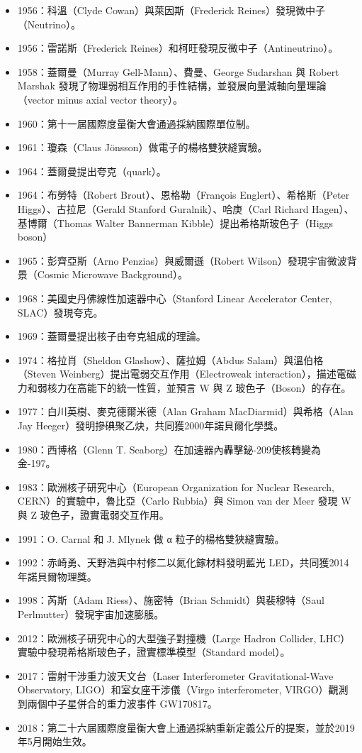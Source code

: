 \documentclass[a4paper,12pt]{article}
\begin{document}
\begin{itemize}
\item 1956：科溫（Clyde Cowan）與萊因斯（Frederick Reines）發現微中子（Neutrino）。
\item 1956：雷諾斯（Frederick Reines）和柯旺發現反微中子（Antineutrino）。
\item 1958：蓋爾曼（Murray Gell-Mann）、費曼、George Sudarshan 與 Robert Marshak 發現了物理弱相互作用的手性結構，並發展向量減軸向量理論（vector minus axial vector theory）。
\item 1960：第十一屆國際度量衡大會通過採納國際單位制。
\item 1961：瓊森（Claus Jönsson）做電子的楊格雙狹縫實驗。
\item 1964：蓋爾曼提出夸克（quark）。
\item 1964：布勞特（Robert Brout）、恩格勒（François Englert）、希格斯（Peter Higgs）、古拉尼（Gerald Stanford Guralnik）、哈庚（Carl Richard Hagen）、基博爾（Thomas Walter Bannerman Kibble）提出希格斯玻色子（Higgs boson）
\item 1965：彭齊亞斯（Arno Penzias）與威爾遜（Robert Wilson）發現宇宙微波背景（Cosmic Microwave Background）。
\item 1968：美國史丹佛線性加速器中心（Stanford Linear Accelerator Center, SLAC）發現夸克。
\item 1969：蓋爾曼提出核子由夸克組成的理論。
\item 1974：格拉肖（Sheldon Glashow）、薩拉姆（Abdus Salam）與溫伯格（Steven Weinberg）提出電弱交互作用（Electroweak interaction），描述電磁力和弱核力在高能下的統一性質，並預言 W 與 Z 玻色子（Boson）的存在。
\item 1977：白川英樹、麥克德爾米德（Alan Graham MacDiarmid）與希格（Alan Jay Heeger）發明摻碘聚乙炔，共同獲2000年諾貝爾化學獎。
\item 1980：西博格（Glenn T. Seaborg）在加速器內轟擊鉍-209使核轉變為金-197。
\item 1983：歐洲核子研究中心（European Organization for Nuclear Research, CERN）的實驗中，魯比亞（Carlo Rubbia）與 Simon van der Meer 發現 W 與 Z 玻色子，證實電弱交互作用。
\item 1991：O. Carnal 和 J. Mlynek 做 α 粒子的楊格雙狹縫實驗。
\item 1992：赤崎勇、天野浩與中村修二以氮化鎵材料發明藍光 LED，共同獲2014年諾貝爾物理獎。
\item 1998：芮斯（Adam Riess）、施密特（Brian Schmidt）與裴穆特（Saul Perlmutter）發現宇宙加速膨脹。
\item 2012：歐洲核子研究中心的大型強子對撞機（Large Hadron Collider, LHC）實驗中發現希格斯玻色子，證實標準模型（Standard model）。
\item 2017：雷射干涉重力波天文台（Laser Interferometer Gravitational-Wave Observatory, LIGO）和室女座干涉儀（Virgo interferometer, VIRGO）觀測到兩個中子星併合的重力波事件 GW170817。
\item 2018：第二十六屆國際度量衡大會上通過採納重新定義公斤的提案，並於2019年5月開始生效。
\end{itemize}
\end{document}
